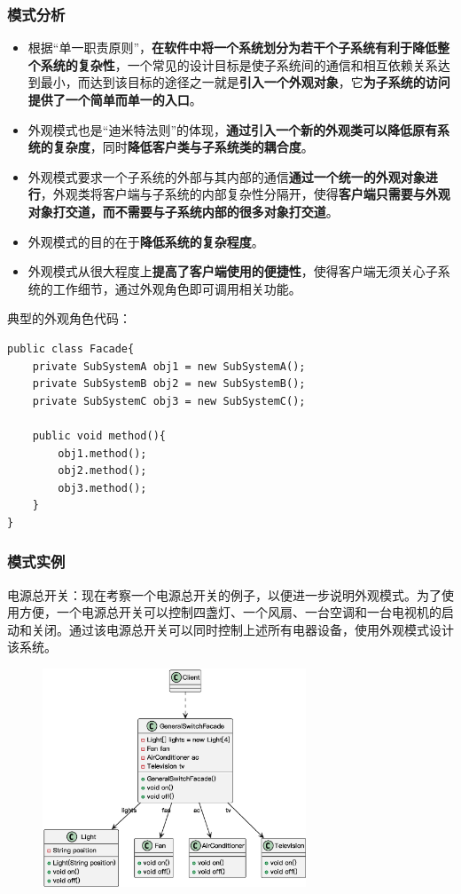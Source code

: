\subsubsection{模式分析}
\begin{itemize}
    \item 根据“单一职责原则”，\textbf{在软件中将一个系统划分为若干个子系统有利于降低整个系统的复杂性}，一个常见的设计目标是使子系统间的通信和相互依赖关系达到最小，而达到该目标的途径之一就是\textbf{引入一个外观对象}，它\textbf{为子系统的访问提供了一个简单而单一的入口}。
    \item 外观模式也是“迪米特法则”的体现，\textbf{通过引入一个新的外观类可以降低原有系统的复杂度}，同时\textbf{降低客户类与子系统类的耦合度}。
    \item 外观模式要求一个子系统的外部与其内部的通信\textbf{通过一个统一的外观对象进行}，外观类将客户端与子系统的内部复杂性分隔开，使得\textbf{客户端只需要与外观对象打交道，而不需要与子系统内部的很多对象打交道}。
    \item 外观模式的目的在于\textbf{降低系统的复杂程度}。
    \item 外观模式从很大程度上\textbf{提高了客户端使用的便捷性}，使得客户端无须关心子系统的工作细节，通过外观角色即可调用相关功能。
\end{itemize}

典型的外观角色代码：
\begin{lstlisting}
public class Facade{
    private SubSystemA obj1 = new SubSystemA();
    private SubSystemB obj2 = new SubSystemB();
    private SubSystemC obj3 = new SubSystemC();

    public void method(){
        obj1.method();
        obj2.method();
        obj3.method();
    }
}
\end{lstlisting}

\subsubsection{模式实例}
电源总开关：现在考察一个电源总开关的例子，以便进一步说明外观模式。为了使用方便，一个电源总开关可以控制四盏灯、一个风扇、一台空调和一台电视机的启动和关闭。通过该电源总开关可以同时控制上述所有电器设备，使用外观模式设计该系统。
\begin{figure}[H]
    \vspace{-0.5em}
	\centering
	\includegraphics[width=0.7\textwidth]{images/外观模式实例1.eps}
    \vspace{-1em}
\end{figure}


